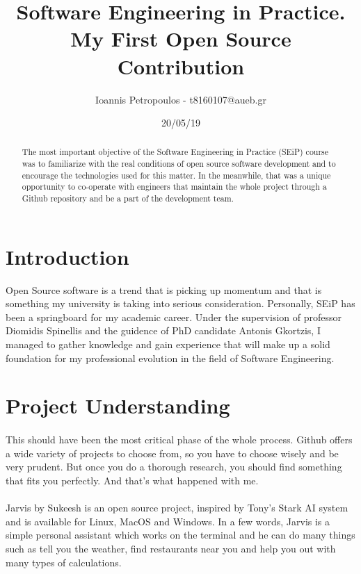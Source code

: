 \documentclass[12pt]{article}
\title{Software Engineering in Practice. My First Open Source Contribution}
\author{Ioannis Petropoulos - t8160107@aueb.gr}
\date{20/05/19}
\begin{document}
\maketitle

\begin{abstract}
  The most important objective of the Software Engineering in Practice (SEiP) course was to familiarize with the real conditions of open source software development and to encourage the technologies used for this matter. In the meanwhile, that was a unique opportunity to co-operate with engineers that maintain the whole project through a Github repository and be a part of the development team.  
\end{abstract}

\section*{Introduction}
   Open Source software is a trend that is picking up momentum \cite{Forbes} and that is something my university is taking into serious consideration. Personally, SEiP has been a springboard for my academic career. Under the supervision of professor Diomidis Spinellis and the guidence of PhD candidate Antonis Gkortzis, I managed to gather knowledge and gain experience that will make up a solid foundation for my professional evolution in the field of Software Engineering.

\section{Project Understanding}

\paragraph{}
  This should have been the most critical phase of the whole process. Github offers a wide variety of projects to choose from, so you have to choose wisely and be very prudent. But once you do a thorough research, you should find something that fits you perfectly. And that's what happened with me.
  
\paragraph{}
  Jarvis by Sukeesh is an open source project, inspired by Tony's Stark AI system \cite{Jarvis} and is available for Linux, MacOS and Windows. In a few words, Jarvis is a simple personal assistant which works on the terminal and he can do many things such as tell you the weather, find restaurants near you and help you out with many types of calculations.
\end{document}
